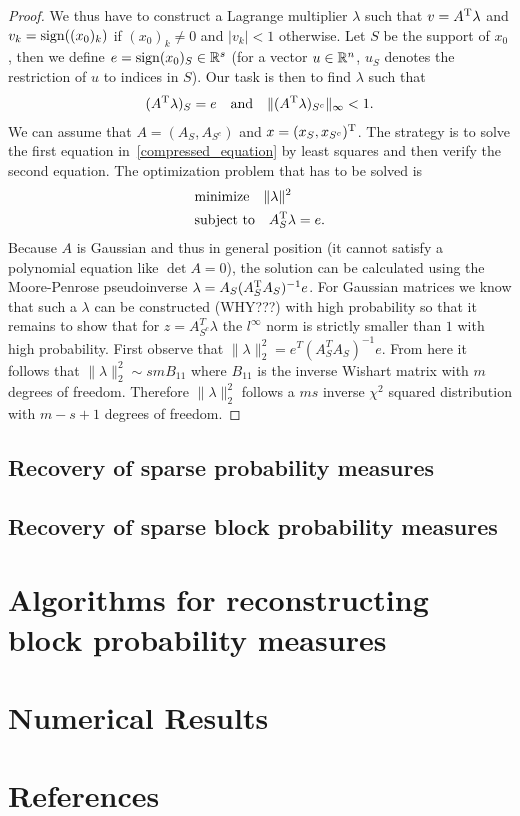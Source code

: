 \documentclass{article} %
\begin{document}
\begin{proof}
   We thus have to construct
  a Lagrange multiplier $\lambda$ such that $v = A^{\rm T} \lambda$ and $v_k = \operatorname{sign}((x_0)_k)$ if $(x_0)_k\neq 0$ and $|v_k| < 1$ otherwise. Let $S$ be the support of $x_0$, then we define $e = \operatorname{sign}(x_0)_S\in \mathbb{R}^s$ (for a vector $u\in \mathbb{R}^n$, $u_S$ denotes the restriction of $u$ to indices in $S$). Our task is then to find $\lambda$ such that
  \begin{align}\label{compressed_equation}
  (A^{\rm T} \lambda)_S = e\quad\text{and}\quad \lVert(A^{\rm T} \lambda)_{S^c}\rVert_\infty < 1.
  \end{align}
  We can assume that $A = (A_S, A_{S^c})$ and $x = (x_S, x_{S^c})^{\rm T}$. The strategy is to solve the first equation in~\eqref{compressed_equation} by least squares and then verify the second equation. The optimization problem that has to be solved is
  \begin{align*}
    &\text{minimize}\quad \lVert\lambda\rVert^2\\
    &\text{subject to}\quad A_S^{\rm T} \lambda = e.
  \end{align*}
    Because $A$ is Gaussian and thus in general position (it cannot satisfy a polynomial equation like $\det A = 0$), the solution can be calculated using the Moore-Penrose pseudoinverse $\lambda = A_S(A_S^{\rm T} A_S)^{-1} e$. For Gaussian matrices we know that such a $\lambda$ can be constructed (WHY???) with high probability so that it remains to show that for $z = A_{S^c}^T\lambda$ the $l^{\infty}$ norm is strictly smaller than $1$ with high probability. First observe that $\|\lambda\|_2^2 = e^T(A_S^TA_S)^{-1} e$. From here it follows that $\|\lambda\|_2^2 \sim smB_{11}$ where $B_{11}$ is the inverse Wishart matrix with $m$ degrees of freedom. Therefore $\|\lambda\|_2^2$ follows a $ms$ inverse $\chi^2$ squared distribution with $m-s+1$ degrees of freedom.  
    \end{proof}

\subsection{Recovery of sparse probability measures}
\subsection{Recovery of sparse block probability measures}
\section{Algorithms for reconstructing block probability measures}
\section{Numerical Results}
\section{References}

\FloatBarrier
\vskip 0.2in


\end{document}
